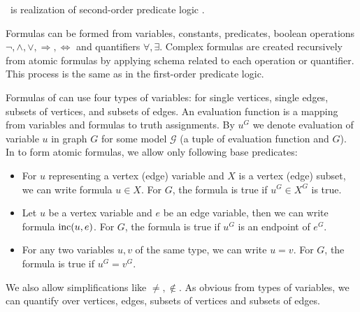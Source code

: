 \MSO{}~is realization of second-order predicate logic%
.

Formulas can be formed from
variables, constants, predicates,
boolean operations \( \lnot, \land, \lor, \Rightarrow, \Leftrightarrow \)
and quantifiers \( \forall, \exists \).
Complex formulas are created recursively from atomic formulas
by applying schema related to each operation or quantifier.
This process is the same as in the first-order predicate logic.

Formulas of \MSO{} can use four types of variables:
for single vertices, single edges, subsets of vertices, and subsets of edges.
An evaluation function is a mapping from variables and formulas to truth assignments.
By \( u^G \) we denote evaluation of variable \( u \) in graph \( G \)
for some model \( \mathcal{G} \) (a tuple of evaluation function and \( G \)).
In \MSO{} to form atomic formulas, we allow only following base predicates:
%
\begin{itemize}
	\item For \( u \) representing a vertex (edge) variable
	      and \( X \) is a vertex (edge) subset,
	      we can write formula \( u \in X \).
	      For \( G \), the formula is true if \( u^G \in X^G \) is true.
	\item Let \( u \) be a vertex variable and \( e \) be an edge variable,
	      then we can write formula \( \text{inc} (u, e) \).
	      For \( G \), the formula is true if \( u^G \) is an endpoint of \( e^G \).
	\item For any two variables \( u, v \) of the same type, we can write \( u = v \).
	      For \( G \), the formula is true if \( u^G = v^G \).
\end{itemize}
%
We also allow simplifications like \( \ne, \not\in \).
As obvious from types of variables, we can quantify over vertices, edges,
subsets of vertices and subsets of edges.

